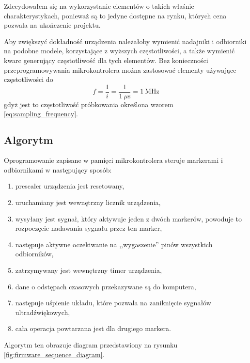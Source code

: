 Zdecydowałem się na wykorzystanie elementów  o takich właśnie charakterystykach, ponieważ są to jedyne dostępne na rynku, których cena pozwala na ukończenie projektu.

Aby zwiększyć dokładność urządzenia należałoby wymienić nadajniki i odbiorniki na podobne modele, korzystające z wyższych częstotliwości, a także wymienić kwarc generujący częstotliwość dla tych elementów. Bez konieczności przeprogramowywania mikrokontrolera można zastosować elementy używające częstotliwości do
\begin{equation}
 f = \frac{1}{i} = \frac{1}{1~\mu\textrm{s}} = 1~\textrm{MHz}
\end{equation}
gdyż jest to częstotliwość próbkowania określona wzorem \ref{eq:sampling_frequency}.

\subsection{Algorytm}
Oprogramowanie zapisane w pamięci mikrokontrolera steruje markerami i odbiornikami w następujący sposób:
\begin{enumerate}
 \item {}prescaler urządzenia jest resetowany,\label{enum:prescaler}
 \item uruchamiany jest wewnętrzny licznik urządzenia,
 \item wysyłany jest sygnał, który aktywuje jeden z dwóch markerów, powoduje to rozpoczęcie nadawania sygnału przez ten marker,
 \item następuje aktywne oczekiwanie na ,,wygaszenie'' pinów wszystkich odbiorników,
 \item zatrzymywany jest wewnętrzny timer urządzenia,
 \item dane o odstępach czasowych przekazywane są do komputera,
 \item następuje uśpienie układu, które pozwala na zaniknięcie sygnałów ultradźwiękowych,
 \item cała operacja powtarzana jest dla drugiego markera.
\end{enumerate}
Algorytm ten obrazuje diagram przedstawiony na rysunku \ref{fig:firmware_sequence_diagram}.

